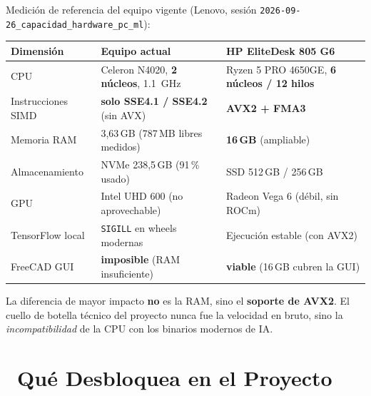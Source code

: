 \documentclass[11pt,a4paper]{article}
\newcommand{\iconotexto}[2]{\textcolor{cyanNeon}{\faIcon{#1}}~#2}
\begin{document}
Medición de referencia del equipo vigente (Lenovo, sesión
\texttt{2026-09-26\_capacidad\_hardware\_pc\_ml}):

\begin{longtable}{p{4.0cm} p{5.0cm} p{5.2cm}}
\toprule
\textbf{Dimensión} & \textbf{Equipo actual} & \textbf{HP EliteDesk 805 G6} \\
\midrule
\endhead
\bottomrule
\endlastfoot
CPU & Celeron N4020, \textbf{2 núcleos}, \SI{1.1}{\giga\hertz} & Ryzen 5 PRO 4650GE, \textbf{6 núcleos / 12 hilos} \\
Instrucciones SIMD & \textbf{solo SSE4.1 / SSE4.2} (sin AVX) & \textbf{AVX2 + FMA3} \\
Memoria RAM & 3{,}63\,GB (787\,MB libres medidos) & \textbf{16\,GB} (ampliable) \\
Almacenamiento & NVMe 238{,}5\,GB (91\,\% usado) & SSD 512\,GB / 256\,GB \\
GPU & Intel UHD 600 (no aprovechable) & Radeon Vega 6 (débil, sin ROCm) \\
TensorFlow local & \texttt{SIGILL} en wheels modernas & Ejecución estable (con AVX2) \\
FreeCAD GUI & \textbf{imposible} (RAM insuficiente) & \textbf{viable} (16\,GB cubren la GUI) \\
\bottomrule
\end{longtable}

\begin{cajaConcepto}
La diferencia de mayor impacto \textbf{no} es la RAM, sino el \textbf{soporte de AVX2}.
El cuello de botella técnico del proyecto nunca fue la velocidad en bruto, sino la
\emph{incompatibilidad} de la CPU con los binarios modernos de IA.
\end{cajaConcepto}

\section[Qué Desbloquea]{\iconotexto{unlock}{Qué Desbloquea en el Proyecto}}
\end{document}
